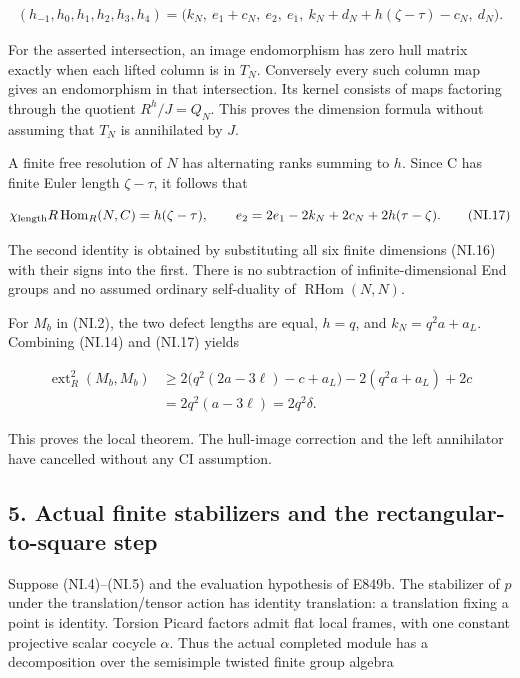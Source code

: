 \[
 \begin{split}
 (h_{-1},h_0,h_1,h_2,h_3,h_4)
  =\bigl(k_N,\ e_1+c_N,\ e_2,\ e_1,\
        k_N+d_N+h(\zeta-\tau)-c_N,\ d_N\bigr).
 \end{split}
 \tag{NI.16}
\]

For the asserted intersection, an image endomorphism has zero
hull matrix exactly when each lifted column is in \(T_N\).
Conversely every such column map gives an endomorphism in that
intersection. Its kernel consists of maps factoring through the
quotient \(R^h/J=Q_N\). This proves the dimension formula without
assuming that \(T_N\) is annihilated by \(J\).

A finite free resolution of \(N\) has alternating ranks summing
to \(h\). Since C has finite Euler length \(\zeta-\tau\), it follows that

\[
 \chi_{\rm length}R\operatorname{Hom}_R(N,C)
       =h(\zeta-\tau),\qquad
 e_2=2e_1-2k_N+2c_N+2h(\tau-\zeta).
 \tag{NI.17}
\]

The second identity is obtained by substituting all six finite
dimensions (NI.16) with their signs into the first. There is no
subtraction of infinite-dimensional End groups and no assumed
ordinary self-duality of \(\operatorname{RHom}(N,N)\).

For \(M_b\) in (NI.2), the two defect lengths are equal, \(h=q\), and
\(k_N=q^2a+a_L\). Combining (NI.14) and (NI.17) yields

\[
 \begin{split}
 \operatorname{ext}^2_R(M_b,M_b)
  &\ge2\bigl(q^2(2a-3\ell)-c+a_L\bigr)
           -2(q^2a+a_L)+2c\\
  &=2q^2(a-3\ell)=2q^2\delta.
 \end{split}
 \tag{NI.18}
\]

This proves the local theorem. The hull-image correction and
the left annihilator have cancelled without any CI assumption.

\subsection{5. Actual finite stabilizers and the rectangular-to-square step}\label{SF-E849:s5}

Suppose (NI.4)--(NI.5) and the evaluation hypothesis of E849b.
The stabilizer of \(p\) under the translation/tensor action has
identity translation: a translation fixing a point is identity.
Torsion Picard factors admit flat local frames, with one constant
projective scalar cocycle \(\alpha\). Thus the actual completed module
has a decomposition over the semisimple twisted finite group
algebra

